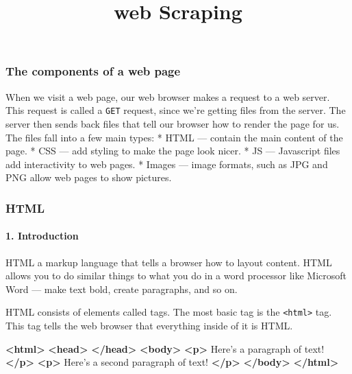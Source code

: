 \documentclass[11pt]{article}
\title{web Scraping}
\newenvironment{Shaded}{}{}
\newcommand{\KeywordTok}[1]{\textcolor[rgb]{0.00,0.44,0.13}{\textbf{{#1}}}}
\newcommand{\NormalTok}[1]{{#1}}
\begin{document}
    
    
    \maketitle
    
    

    
    \hypertarget{the-components-of-a-web-page}{%
\subsubsection{The components of a web
page}\label{the-components-of-a-web-page}}

When we visit a web page, our web browser makes a request to a web
server. This request is called a \texttt{GET} request, since we're
getting files from the server. The server then sends back files that
tell our browser how to render the page for us. The files fall into a
few main types: * HTML --- contain the main content of the page. * CSS
--- add styling to make the page look nicer. * JS --- Javascript files
add interactivity to web pages. * Images --- image formats, such as JPG
and PNG allow web pages to show pictures.

    \hypertarget{html}{%
\subsubsection{HTML}\label{html}}

\hypertarget{introduction}{%
\paragraph{1. Introduction}\label{introduction}}

HTML a markup language that tells a browser how to layout content. HTML
allows you to do similar things to what you do in a word processor like
Microsoft Word --- make text bold, create paragraphs, and so on.

HTML consists of elements called tags. The most basic tag is the
\texttt{\textless{}html\textgreater{}} tag. This tag tells the web
browser that everything inside of it is HTML.

\begin{Shaded}
\begin{Highlighting}[]
\KeywordTok{<html>}
    \KeywordTok{<head>}
    \KeywordTok{</head>}
    \KeywordTok{<body>}
        \KeywordTok{<p>}
\NormalTok{            Here's a paragraph of text!}
        \KeywordTok{</p>}
        \KeywordTok{<p>}
\NormalTok{            Here's a second paragraph of text!}
        \KeywordTok{</p>}
    \KeywordTok{</body>}
\KeywordTok{</html>}
\end{Highlighting}
\end{Shaded}
\end{document}
